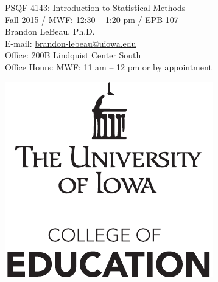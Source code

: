 \documentclass[11pt,article,oneside]{memoir}
\begin{document}
\setsansfont[Mapping=tex-text]{Myriad Pro} 
\setmonofont[Mapping=tex-text,Scale=0.8]{Pragmata} 

\def\ind{\hangindent=1 true cm\hangafter=1 \noindent}
\def\labelitemi{$\cdot$}


  

\begin{minipage}[b]{.7\linewidth}
\begin{flushleft}
{\huge PSQF 4143: Introduction to Statistical Methods} \\[.1in]
{\large\sffamily Fall 2015 / MWF: 12:30 -- 1:20 pm / EPB 107} \\
\vspace*{.25in}
{\large Brandon LeBeau, Ph.D.} \\[.05in]
{\normalsize E-mail: \href{mailto:brandon-lebeau@uiowa.edu}{brandon-lebeau@uiowa.edu} \\Office: 200B Lindquist Center South \\ Office Hours: MWF: 11 am -- 12 pm or by appointment}
\end{flushleft}
\end{minipage}
\begin{minipage}[t]{.3\linewidth}
\includegraphics[width=.9\linewidth]{DomeUIed}
\end{minipage}
\end{document}
